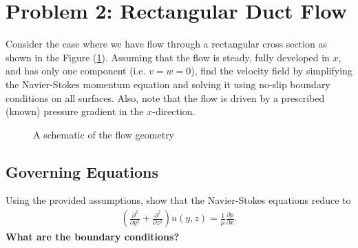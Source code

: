 \documentclass[11pt]{article}
\begin{document}
    \begin{solution}
        
    \end{solution}
    \pagebreak

    \section{Problem 2:  Rectangular Duct Flow}
    Consider the case where we have flow through a rectangular cross section as shown in the Figure (\ref{fig:rect_duct}). Assuming that the flow is steady, fully developed in $x$, and has only one component (i.e. $v = w = 0$), find the velocity field by simplifying the Navier-Stokes momentum equation and solving it using no-slip boundary conditions on all surfaces. Also, note that the flow is driven by a prescribed (known) pressure gradient in the $x$-direction.

    \begin{figure}[H]
		\centering
		\caption{A schematic of the flow geometry}
		\label{fig:rect_duct}
	\end{figure}

    \subsection{Governing Equations}
    Using the provided assumptions, show that the Navier-Stokes equations reduce to
    \begin{align}
      \left(\frac{\partial^2}{\partial y^2} + \frac{\partial^2}{\partial z^2}\right) u(y,z) = \frac{1}{\mu}\frac{\partial p}{\partial x}.
    \end{align}
    \textbf{What are the boundary conditions?}
    
\end{document}
